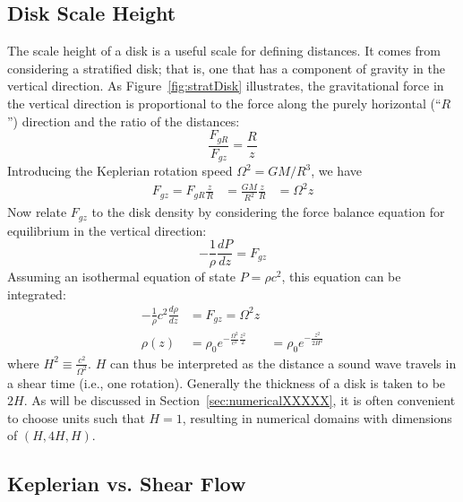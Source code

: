 \subsection{Disk Scale Height}
The scale height of a disk is a useful scale for defining distances. It comes from considering a stratified disk; that is, one that has a component of gravity in the vertical direction. As Figure~\ref{fig:stratDisk} illustrates, the gravitational force in the vertical direction is proportional to the force along the purely horizontal (``$R$'') direction and the ratio of the distances:
\begin{equation}
\frac{F_{gR}}{F_{gz}}=\frac{R}{z}
\end{equation}
Introducing the Keplerian rotation speed $\Omega^2=GM/R^3$, we have  
\begin{align*}
F_{gz}=F_{gR}\frac z R&=\frac{GM}{R^2}\frac zR
&=\Omega^2 z
\end{align*}
Now relate $F_{gz}$ to the disk density by considering the force balance equation for equilibrium in the vertical direction:
\begin{equation*}
-\frac1\rho\frac{dP}{dz}=F_{gz}
\end{equation*}
Assuming an isothermal equation of state $P=\rho c^2$, this equation can be integrated:
\begin{align*}
-\frac1\rho c^2\frac{d\rho}{dz}&=F_{gz}=\Omega^2z\\
\rho(z)&=\rho_0 e^{-\frac{\Omega^2}{c^2}\frac{z^2}2}
&=\rho_0e^{-\frac{z^2}{2H^2}}
\end{align*}
where $H^2\equiv\frac{c^2}{\Omega^2}$. $H$ can thus be interpreted as the distance a sound wave travels in a shear time (i.e., one rotation). Generally the thickness of a disk is taken to be $2H$. As will be discussed in Section~\ref{sec:numericalXXXXX}, it is often convenient to choose units such that $H=1$, resulting in numerical domains with dimensions of $(H,4H,H)$. 



\subsection{Keplerian vs. Shear Flow}

